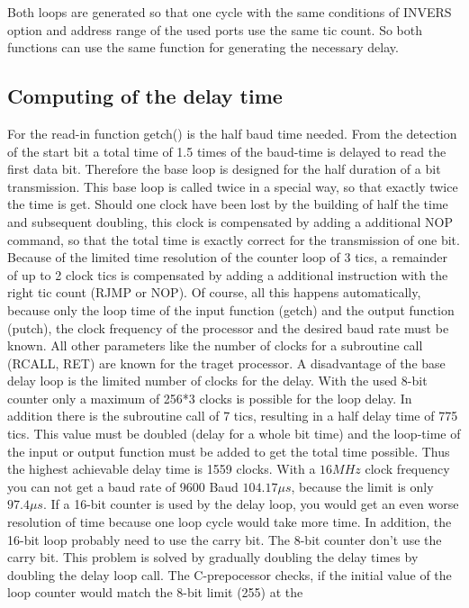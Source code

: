 Both loops are generated so that one cycle with the same conditions of INVERS option and
address range of the used ports use the same tic count.
So both functions can use the same function for generating the necessary delay.

\subsection{Computing of the delay time}
For the read-in function getch() is the half baud time needed.
From the detection of the start bit a total time of 1.5 times of the baud-time is delayed
to read the first data bit.
Therefore the base loop is designed for the half duration of a bit transmission.
This base loop is called twice in a special way, so that exactly twice the time is get.
Should one clock have been lost by the building of half the time and subsequent doubling,
this clock is compensated by adding a additional NOP command, so that the total time
is exactly correct for the transmission of one bit.
Because of the limited time resolution of the counter loop of 3 tics, a remainder of up to 2 clock tics
is compensated by adding a additional instruction with the right tic count (RJMP or NOP).
Of course, all this happens automatically, because only the loop time of the input function (getch)
and the output function (putch), the clock frequency of the processor and the desired baud rate
must be known. All other parameters like the number of clocks for a subroutine call (RCALL, RET)
are known for the traget processor.
A disadvantage of the base delay loop is the limited number of clocks for the delay.
With the used 8-bit counter only a maximum of 256*3 clocks is possible for the loop delay.
In addition there is the subroutine call of 7 tics, resulting in a half delay time of 775 tics.
This value must be doubled (delay for a whole bit time) and the loop-time of the input or output
function must be added to get the total time possible. Thus the highest achievable delay time is 1559 clocks.
With a \(16 MHz\) clock frequency you can not get a baud rate of 9600 Baud \(104.17\mu s\), because
the limit is only \(97.4\mu s\).
If a 16-bit counter is used by the delay loop, you would get an even worse resolution of time
because one loop cycle would take more time.
In addition, the 16-bit loop probably need to use the carry bit. The 8-bit counter don't use the carry bit.
This problem is solved by gradually doubling the delay times by doubling the delay loop call.
The C-prepocessor checks, if the initial value of the loop counter would match the 8-bit limit (255) at the
